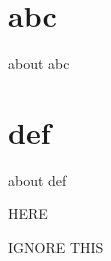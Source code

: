 \documentclass{book}
\begin{document}
\chapter{abc}

about abc

\chapter{def}

about def


HERE


IGNORE THIS
\end{document}
